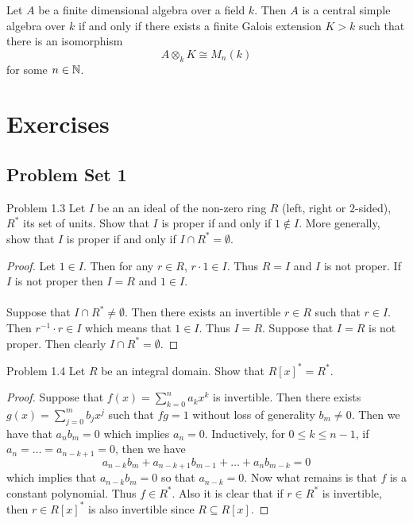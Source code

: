\documentclass[a4paper]{article}
\begin{document}
\begin{crl}{}{} Let $A$ be a finite dimensional algebra over a field $k$. Then $A$ is a central simple algebra over $k$ if and only if there exists a finite Galois extension $K>k$ such that there is an isomorphism $$A\otimes_k K\cong M_n(k)$$ for some $n\in\mathbb{N}$. 
\end{crl}

\pagebreak
\section{Exercises}
\subsection{Problem Set 1}
\begin{ex}{Problem 1.3}{} Let $I$ be an an ideal of the non-zero ring $R$ (left, right or $2$-sided), $R^\ast$ its set of units. Show that $I$ is proper if and only if $1\notin I$. More generally, show that $I$ is proper if and only if $I\cap R^\ast=\emptyset$. \tcbline
\begin{proof}
Let $1\in I$. Then for any $r\in R$, $r\cdot 1\in I$. Thus $R=I$ and $I$ is not proper. If $I$ is not proper then $I=R$ and $1\in I$. \\~\\

Suppose that $I\cap R^\ast\neq\emptyset$. Then there exists an invertible $r\in R$ such that $r\in I$. Then $r^{-1}\cdot r\in I$ which means that $1\in I$. Thus $I=R$. Suppose that $I=R$ is not proper. Then clearly $I\cap R^\ast=\emptyset$. 
\end{proof}
\end{ex}

\begin{ex}{Problem 1.4}{} Let $R$ be an integral domain. Show that $R[x]^\ast=R^\ast$. \tcbline
\begin{proof}
Suppose that $f(x)=\sum_{k=0}^na_kx^k$ is invertible. Then there exists $g(x)=\sum_{j=0}^mb_jx^j$ such that $fg=1$ without loss of generality $b_m\neq 0$. Then we have that $a_nb_m=0$ which implies $a_n=0$. Inductively, for $0\leq k\leq n-1$, if $a_n=\dots=a_{n-k+1}=0$, then we have $$a_{n-k}b_m+a_{n-k+1}b_{m-1}+\dots+a_nb_{m-k}=0$$ which implies that $a_{n-k}b_m=0$ so that $a_{n-k}=0$. Now what remains is that $f$ is a constant polynomial. Thus $f\in R^\ast$. Also it is clear that if $r\in R^\ast$ is invertible, then $r\in R[x]^\ast$ is also invertible since $R\subseteq R[x]$. 
\end{proof}
\end{ex}
\end{document}
